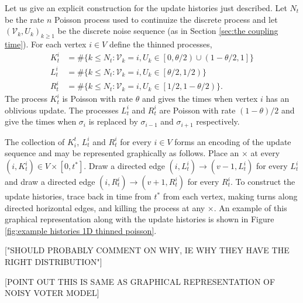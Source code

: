 	Let us give an explicit construction for the update histories just described. Let $N_t$ be the rate $n$ Poisson process used to continuize the discrete process and let $(\mathcal{V}_k, U_k)_{k\geq1}$ be the discrete noise sequence (as in Section \ref{sec:the coupling time}). For each vertex $i \in V$ define the thinned processes,
	\begin{align}
		K^i_t &= \#\{k \leq N_t: \mathcal{V}_k = i, U_k \in \left[0, \theta/2\right) \cup \left(1 - \theta/2, 1\right]\}\\
		L^i_t &= \#\{k \leq N_t: \mathcal{V}_k = i, U_k \in \left[\theta/2, 1/2\right)\}\\
		R^i_t &= \#\{k \leq N_t: \mathcal{V}_k = i, U_k \in \left[1/2, 1 - \theta/2\right)\}.
	\end{align}
	The process $K_t^i$ is Poisson with rate $\theta$ and gives the times when vertex $i$ has an oblivious update. The processes $L_t^i$ and $R_t^i$ are Poisson with rate $(1 - \theta)/2$ and give the times when $\sigma_i$ is replaced by $\sigma_{i-1}$ and $\sigma_{i+1}$ respectively.

	The collection of $K_i^t$, $L_t^i$ and $R_t^i$ for every $i \in V$ forms an encoding of the update sequence and may be represented graphically as follows. Place an $\times$ at every $(i, K_t^i) \in V \times [0, t^*]$. Draw a directed edge $(i, L_t^i) \rightarrow (v - 1, L_t^i)$ for every $L_t^i$ and draw a directed edge $(i, R_t^i) \rightarrow (v + 1, R_t^i)$ for every $R_t^i$. To construct the update histories, trace back in time from $t^*$ from each vertex, making turns along directed horizontal edges, and killing the process at any $\times$. An example of this graphical representation along with the update histories is shown in Figure \ref{fig:example histories 1D thinned poisson}.

	["SHOULD PROBABLY COMMENT ON WHY, IE WHY THEY HAVE THE RIGHT DISTRIBUTION"]

	[POINT OUT THIS IS SAME AS GRAPHICAL REPRESENTATION OF NOISY VOTER MODEL]

